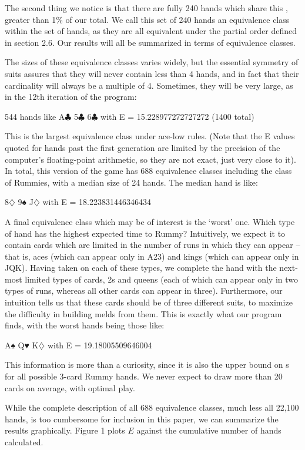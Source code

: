 \documentclass[paper=a4, fontsize=11pt,twoside]{report}   %
\begin{document}
The second thing we notice is that there are fully 240 hands which share this , greater than 1$\%$ of our total. We call this set of 240 hands an equivalence class within the set of hands, as they are all equivalent under the partial order defined in section 2.6. Our results will all be summarized in terms of equivalence classes. 

The sizes of these equivalence classes varies widely, but the essential symmetry of suits assures that they will never contain less than 4 hands, and in fact that their cardinality will always be a multiple of 4. Sometimes, they will be very large, as in the 12th iteration of the program: 

544 hands like A$\clubsuit$ 5$\clubsuit$ 6$\clubsuit$ with E = 15.228977272727272 (1400 total) 

This is the largest equivalence class under ace-low rules. (Note that the E values quoted for hands past the first generation are limited by the precision of the computer’s floating-point arithmetic, so they are not exact, just very close to it). In total, this version of the game has 688 equivalence classes including the class of Rummies, with a median size of 24 hands. The median hand is like: 

8$\diamondsuit$ 9♠ J$\diamondsuit$ with E = 18.223831446346434 

A final equivalence class which may be of interest is the ‘worst’ one. Which type of hand has the highest expected time to Rummy?  Intuitively, we expect it to contain cards which are limited in the number of runs in which they can appear – that is, aces (which can appear only in A23) and kings (which can appear only in JQK). Having taken on each of these types, we complete the hand with the next-most limited types of cards, 2s and queens (each of which can appear only in two types of runs, whereas all other cards can appear in three). Furthermore, our intuition tells us that these cards should be of three different suits, to maximize the difficulty in building melds from them. This is exactly what our program finds, with the worst hands being those like: 

A♠ Q♥ K$\diamondsuit$ with E = 19.18005509646004 

This information is more than a curiosity, since it is also the upper bound on s for all possible 3-card Rummy hands. We never expect to draw more than 20 cards on average, with optimal play. 

While the complete description of all 688 equivalence classes, much less all 22,100 hands, is too cumbersome for inclusion in this paper, we can summarize the results graphically. Figure 1 plots $E$ against the cumulative number of hands calculated.
\end{document}
